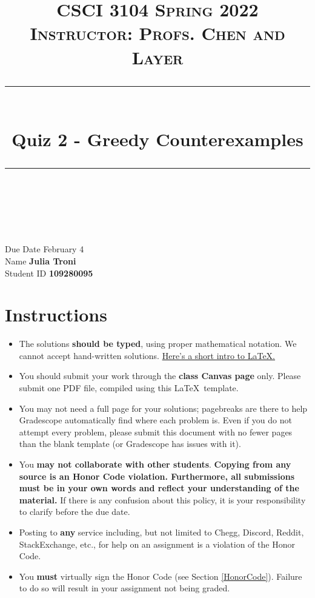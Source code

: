 \documentclass[11pt]{article}
\title{
\normalfont \normalsize 
\textsc{CSCI 3104 Spring 2022\\
Instructor: Profs. Chen and Layer} \\
[10pt] 
\rule{\linewidth}{0.5pt} \\[6pt] 
\huge Quiz 2 - Greedy Counterexamples \\
\rule{\linewidth}{2pt}  \\[10pt]
}
\date{}
\theoremstyle{definition}
\theoremstyle{definition}
\theoremstyle{definition}
\begin{document}
\maketitle


\noindent
Due Date \dotfill February 4 \\
Name \dotfill \textbf{Julia Troni} \\
Student ID \dotfill \textbf{109280095} \\


\tableofcontents

\section{Instructions}
 \begin{itemize}
	\item The solutions \textbf{should be typed}, using proper mathematical notation. We cannot accept hand-written solutions. \href{http://ece.uprm.edu/~caceros/latex/introduction.pdf}{Here's a short intro to \LaTeX.}
	\item You should submit your work through the \textbf{class Canvas page} only. Please submit one PDF file, compiled using this \LaTeX \ template.
	\item You may not need a full page for your solutions; pagebreaks are there to help Gradescope automatically find where each problem is. Even if you do not attempt every problem, please submit this document with no fewer pages than the blank template (or Gradescope has issues with it).

	\item You \textbf{may not collaborate with other students}. \textbf{Copying from any source is an Honor Code violation. Furthermore, all submissions must be in your own words and reflect your understanding of the material.} If there is any confusion about this policy, it is your responsibility to clarify before the due date. 

	\item Posting to \textbf{any} service including, but not limited to Chegg, Discord, Reddit, StackExchange, etc., for help on an assignment is a violation of the Honor Code.

	\item You \textbf{must} virtually sign the Honor Code (see Section \ref{HonorCode}). Failure to do so will result in your assignment not being graded.
\end{itemize}
\end{document}
